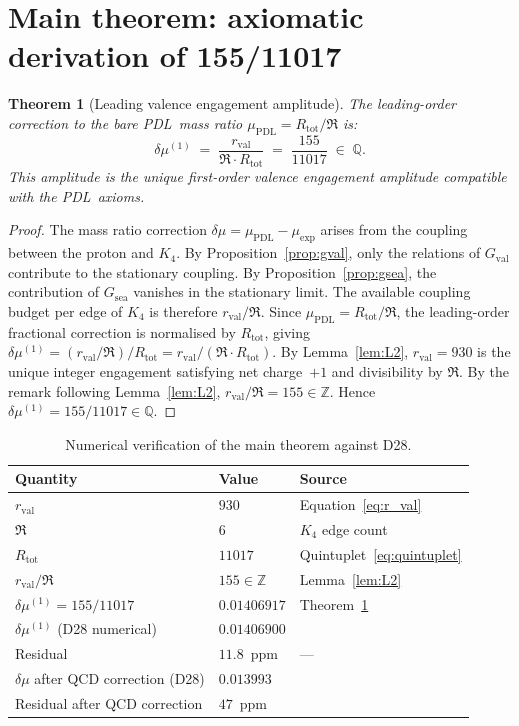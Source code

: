 \documentclass[11pt,a4paper]{article}
\newtheorem{theorem}{Theorem}[section]
\theoremstyle{definition}
\newcommand{\PDL}{\textnormal{PDL}}
\newcommand{\Rtot}{R_{\mathrm{tot}}}
\newcommand{\rval}{r_{\mathrm{val}}}
\newcommand{\Kfour}{K_4}
\newcommand{\muPDL}{\mu_{\mathrm{PDL}}}
\newcommand{\muexp}{\mu_{\mathrm{exp}}}
\newcommand{\dmu}{\delta\mu}
\newcommand{\Gval}{G_{\mathrm{val}}}
\newcommand{\Gsea}{G_{\mathrm{sea}}}
\begin{document}
\section{Main theorem: axiomatic derivation of 155/11017}
\label{sec:main}

\begin{theorem}[Leading valence engagement amplitude]
\label{thm:main}
The leading-order correction to the bare \PDL\ mass ratio $\muPDL = \Rtot/\Re$ is:
\begin{equation}
\label{eq:main}
\dmu^{(1)} \;=\; \frac{\rval}{\Re\cdot\Rtot} \;=\; \frac{155}{11017} \;\in\; \mathbb{Q}.
\end{equation}
This amplitude is the unique first-order valence engagement amplitude compatible with the \PDL\ axioms.
\end{theorem}

\begin{proof}
The mass ratio correction $\dmu = \muPDL - \muexp$ arises from the coupling between the proton and $\Kfour$. By Proposition~\ref{prop:gval}, only the relations of $\Gval$ contribute to the stationary coupling. By Proposition~\ref{prop:gsea}, the contribution of $\Gsea$ vanishes in the stationary limit. The available coupling budget per edge of $\Kfour$ is therefore $\rval/\Re$. Since $\muPDL = \Rtot/\Re$, the leading-order fractional correction is normalised by $\Rtot$, giving $\dmu^{(1)} = (\rval/\Re)/\Rtot = \rval/(\Re\cdot\Rtot)$. By Lemma~\ref{lem:L2}, $\rval = 930$ is the unique integer engagement satisfying net charge~$+1$ and divisibility by $\Re$. By the remark following Lemma~\ref{lem:L2}, $\rval/\Re = 155 \in \mathbb{Z}$. Hence $\dmu^{(1)} = 155/11017 \in \mathbb{Q}$.
\end{proof}

\begin{table}[ht]
\centering
\caption{Numerical verification of the main theorem against D28.}
\label{tab:numerical}
\bigskip
\begin{tabular}{p{6cm}p{4cm}p{3.5cm}}
\toprule
Quantity & Value & Source \\
\midrule
$\rval$ & $930$ & Equation~\eqref{eq:r_val} \\
$\Re$ & $6$ & $\Kfour$ edge count \\
$\Rtot$ & $11017$ & Quintuplet~\eqref{eq:quintuplet} \\
$\rval / \Re$ & $155 \in \mathbb{Z}$ & Lemma~\ref{lem:L2} \\
$\dmu^{(1)} = 155/11017$ & $0.01406917$ & Theorem~\ref{thm:main} \\
$\dmu^{(1)}$ (D28 numerical) & $0.01406900$ & \cite{PDL_D28_2026} \\
Residual & $11.8$~ppm & --- \\
$\dmu$ after QCD correction (D28) & $0.013993$ & \cite{PDL_D28_2026} \\
Residual after QCD correction & $47$~ppm & \cite{PDL_D28_2026} \\
\bottomrule
\end{tabular}
\end{table}
\end{document}
